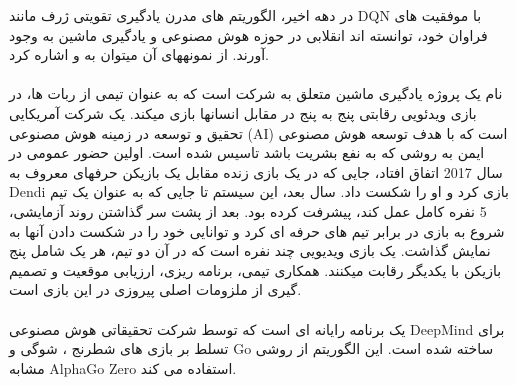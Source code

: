 در دهه اخیر، الگوریتم های مدرن یادگیری تقویتی  ژرف مانند DQN با موفقیت های فراوان خود، توانسته اند انقلابی در حوزه هوش مصنوعی و یادگیری ماشین به وجود آورند. از نمونه\nf های آن می\nf توان به
 و
   اشاره کرد.
  
  \paragraph{}
    
   نام یک پروژه یادگیری ماشین متعلق به شرکت 
   است که به عنوان تیمی از ربات ها،  در بازی ویدئویی رقابتی پنج به پنج 
     در مقابل انسان\nf ها بازی می\nf کند.
 یک شرکت آمریکایی تحقیق و توسعه در زمینه هوش مصنوعی (AI) است که با هدف توسعه هوش مصنوعی ایمن به روشی که به نفع بشریت باشد تاسیس شده است. اولین حضور عمومی
  در سال 2017 اتفاق افتاد، جایی که در یک بازی زنده مقابل یک بازیکن حرفه\nf ای معروف به Dendi بازی کرد و او را شکست داد. سال بعد، این سیستم تا جایی که به عنوان یک تیم 5 نفره کامل عمل کند، پیشرفت کرده بود. بعد از پشت سر گذاشتن روند آزمایشی، شروع به بازی در برابر تیم های حرفه ای کرد و توانایی خود را در شکست دادن آن\nf ها به نمایش گذاشت. 
  یک بازی ویدیویی چند نفره است که در آن دو تیم، هر یک شامل پنج بازیکن با یکدیگر رقابت می\nf کنند. همکاری تیمی، برنامه ریزی، ارزیابی موقعیت و تصمیم گیری از ملزومات اصلی پیروزی در این بازی است.
   
   
   

%
  
  

\paragraph{}
یک برنامه رایانه ای است که توسط شرکت تحقیقاتی هوش مصنوعی DeepMind برای تسلط بر بازی های شطرنج ، شوگی و 
Go
  ساخته شده است. این الگوریتم از روشی مشابه AlphaGo Zero استفاده می کند.

